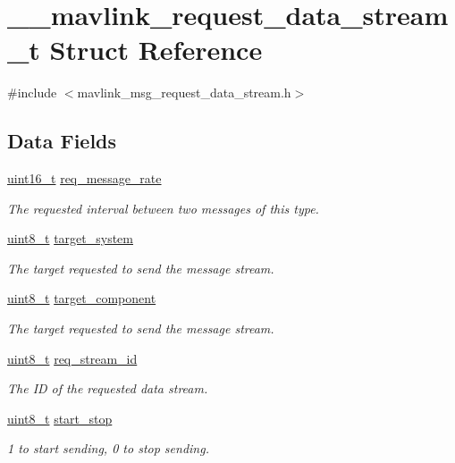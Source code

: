\hypertarget{struct____mavlink__request__data__stream__t}{\section{\-\_\-\-\_\-mavlink\-\_\-request\-\_\-data\-\_\-stream\-\_\-t Struct Reference}
\label{struct____mavlink__request__data__stream__t}
}


{\ttfamily \#include $<$mavlink\-\_\-msg\-\_\-request\-\_\-data\-\_\-stream.\-h$>$}

\subsection*{Data Fields}
\begin{DoxyCompactItemize}
\item 
\hyperlink{stdint_8h_a273cf69d639a59973b6019625df33e30}{uint16\-\_\-t} \hyperlink{struct____mavlink__request__data__stream__t_a7be3844fa9c61b28b51dbd1fc452c1f0}{req\-\_\-message\-\_\-rate}
\begin{DoxyCompactList}\small\item\em The requested interval between two messages of this type. \end{DoxyCompactList}\item 
\hyperlink{stdint_8h_aba7bc1797add20fe3efdf37ced1182c5}{uint8\-\_\-t} \hyperlink{struct____mavlink__request__data__stream__t_ad18b3be12f7ec2056677acd15c286d0a}{target\-\_\-system}
\begin{DoxyCompactList}\small\item\em The target requested to send the message stream. \end{DoxyCompactList}\item 
\hyperlink{stdint_8h_aba7bc1797add20fe3efdf37ced1182c5}{uint8\-\_\-t} \hyperlink{struct____mavlink__request__data__stream__t_aab4483f29d41d2e72070bd4295e1395f}{target\-\_\-component}
\begin{DoxyCompactList}\small\item\em The target requested to send the message stream. \end{DoxyCompactList}\item 
\hyperlink{stdint_8h_aba7bc1797add20fe3efdf37ced1182c5}{uint8\-\_\-t} \hyperlink{struct____mavlink__request__data__stream__t_af2333e886475f59842af3fd6ac61c08b}{req\-\_\-stream\-\_\-id}
\begin{DoxyCompactList}\small\item\em The I\-D of the requested data stream. \end{DoxyCompactList}\item 
\hyperlink{stdint_8h_aba7bc1797add20fe3efdf37ced1182c5}{uint8\-\_\-t} \hyperlink{struct____mavlink__request__data__stream__t_aca2ea67e9e22299721f98ea586d78f07}{start\-\_\-stop}
\begin{DoxyCompactList}\small\item\em 1 to start sending, 0 to stop sending. \end{DoxyCompactList}\end{DoxyCompactItemize}


